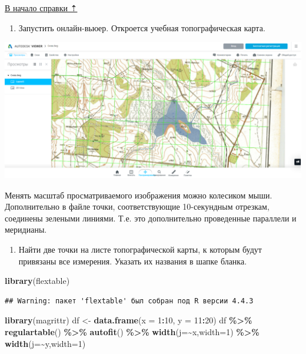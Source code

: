 \documentclass[
  12pt,
]{book}
\newenvironment{Shaded}{\begin{snugshade}}{\end{snugshade}}
\newcommand{\AttributeTok}[1]{\textcolor[rgb]{0.13,0.29,0.53}{#1}}
\newcommand{\DecValTok}[1]{\textcolor[rgb]{0.00,0.00,0.81}{#1}}
\newcommand{\FunctionTok}[1]{\textcolor[rgb]{0.13,0.29,0.53}{\textbf{#1}}}
\newcommand{\NormalTok}[1]{#1}
\newcommand{\OtherTok}[1]{\textcolor[rgb]{0.56,0.35,0.01}{#1}}
\newcommand{\SpecialCharTok}[1]{\textcolor[rgb]{0.81,0.36,0.00}{\textbf{#1}}}
\providecommand{\tightlist}{%
  \setlength{\itemsep}{0pt}\setlength{\parskip}{0pt}}
\begin{document}
\hyperref[coordinates]{В начало справки ⇡}

\begin{enumerate}
\def\labelenumi{\arabic{enumi}.}
\tightlist
\item
  Запустить онлайн-вьюер. Откроется учебная топографическая карта.
\end{enumerate}

\includegraphics{images/Coordinates/DWG_View.png}

Менять масштаб просматриваемого изображения можно колесиком мыши. Дополнительно в файле точки, соответствующие 10-секундным отрезкам, соединены зелеными линиями. Т.е. это дополнительно проведенные параллели и меридианы.

\begin{enumerate}
\def\labelenumi{\arabic{enumi}.}
\setcounter{enumi}{1}
\tightlist
\item
  Найти две точки на листе топографической карты, к которым будут привязаны все измерения. Указать их названия в шапке бланка.
\end{enumerate}

\begin{Shaded}
\begin{Highlighting}[]
\FunctionTok{library}\NormalTok{(flextable)}
\end{Highlighting}
\end{Shaded}

\begin{verbatim}
## Warning: пакет 'flextable' был собран под R версии 4.4.3
\end{verbatim}

\begin{Shaded}
\begin{Highlighting}[]
\FunctionTok{library}\NormalTok{(magrittr)}
\NormalTok{df }\OtherTok{\textless{}{-}} \FunctionTok{data.frame}\NormalTok{(}\AttributeTok{x =} \DecValTok{1}\SpecialCharTok{:}\DecValTok{10}\NormalTok{, }\AttributeTok{y =} \DecValTok{11}\SpecialCharTok{:}\DecValTok{20}\NormalTok{)}
\NormalTok{df }\SpecialCharTok{\%\textgreater{}\%} \FunctionTok{regulartable}\NormalTok{() }\SpecialCharTok{\%\textgreater{}\%} \FunctionTok{autofit}\NormalTok{() }\SpecialCharTok{\%\textgreater{}\%} 
\FunctionTok{width}\NormalTok{(}\AttributeTok{j=}\SpecialCharTok{\textasciitilde{}}\NormalTok{x,}\AttributeTok{width=}\DecValTok{1}\NormalTok{) }\SpecialCharTok{\%\textgreater{}\%} \FunctionTok{width}\NormalTok{(}\AttributeTok{j=}\SpecialCharTok{\textasciitilde{}}\NormalTok{y,}\AttributeTok{width=}\DecValTok{1}\NormalTok{)}
\end{Highlighting}
\end{Shaded}
\end{document}
